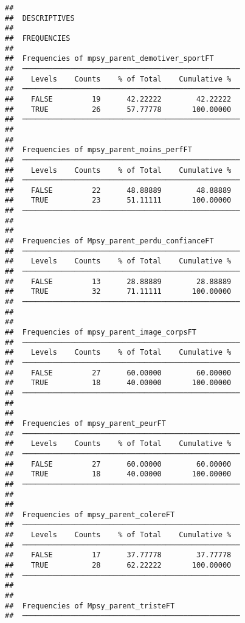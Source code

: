 \documentclass[
]{article}
\begin{document}
\begin{verbatim}
## 
##  DESCRIPTIVES
## 
##  FREQUENCIES
## 
##  Frequencies of mpsy_parent_demotiver_sportFT       
##  ────────────────────────────────────────────────── 
##    Levels    Counts    % of Total    Cumulative %   
##  ────────────────────────────────────────────────── 
##    FALSE         19      42.22222        42.22222   
##    TRUE          26      57.77778       100.00000   
##  ────────────────────────────────────────────────── 
## 
## 
##  Frequencies of mpsy_parent_moins_perfFT            
##  ────────────────────────────────────────────────── 
##    Levels    Counts    % of Total    Cumulative %   
##  ────────────────────────────────────────────────── 
##    FALSE         22      48.88889        48.88889   
##    TRUE          23      51.11111       100.00000   
##  ────────────────────────────────────────────────── 
## 
## 
##  Frequencies of Mpsy_parent_perdu_confianceFT       
##  ────────────────────────────────────────────────── 
##    Levels    Counts    % of Total    Cumulative %   
##  ────────────────────────────────────────────────── 
##    FALSE         13      28.88889        28.88889   
##    TRUE          32      71.11111       100.00000   
##  ────────────────────────────────────────────────── 
## 
## 
##  Frequencies of mpsy_parent_image_corpsFT           
##  ────────────────────────────────────────────────── 
##    Levels    Counts    % of Total    Cumulative %   
##  ────────────────────────────────────────────────── 
##    FALSE         27      60.00000        60.00000   
##    TRUE          18      40.00000       100.00000   
##  ────────────────────────────────────────────────── 
## 
## 
##  Frequencies of mpsy_parent_peurFT                  
##  ────────────────────────────────────────────────── 
##    Levels    Counts    % of Total    Cumulative %   
##  ────────────────────────────────────────────────── 
##    FALSE         27      60.00000        60.00000   
##    TRUE          18      40.00000       100.00000   
##  ────────────────────────────────────────────────── 
## 
## 
##  Frequencies of mpsy_parent_colereFT                
##  ────────────────────────────────────────────────── 
##    Levels    Counts    % of Total    Cumulative %   
##  ────────────────────────────────────────────────── 
##    FALSE         17      37.77778        37.77778   
##    TRUE          28      62.22222       100.00000   
##  ────────────────────────────────────────────────── 
## 
## 
##  Frequencies of Mpsy_parent_tristeFT                
##  ────────────────────────────────────────────────── 

\end{verbatim}
\end{document}
